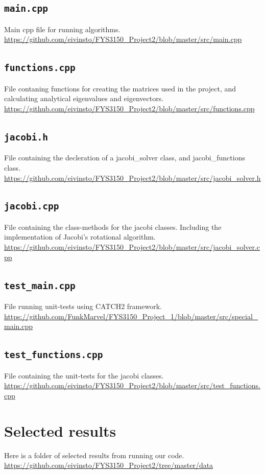 \documentclass[reprint,english,notitlepage]{revtex4-1}  %
\begin{document}
\cprotect\subsection{\verb+main.cpp+} \label{A.2}
Main cpp file for running algorithms.
\url{https://github.com/eivinsto/FYS3150_Project2/blob/master/src/main.cpp}

\cprotect\subsection{\verb+functions.cpp+} \label{A.3}
File contaning functions for creating the matrices used in the project, and calculating analytical eigenvalues and eigenvectors.
\url{https://github.com/eivinsto/FYS3150_Project2/blob/master/src/functions.cpp}

\cprotect\subsection{\verb+jacobi.h+} \label{A.4}
File containing the decleration of a jacobi\_solver class, and jacobi\_functions class.
\url{https://github.com/eivinsto/FYS3150_Project2/blob/master/src/jacobi_solver.h}

\cprotect\subsection{\verb+jacobi.cpp+} \label{A.5}
File containing the class-methods for the jacobi classes. Including the implementation of Jacobi's rotational algorithm.
\url{https://github.com/eivinsto/FYS3150_Project2/blob/master/src/jacobi_solver.cpp}

\cprotect\subsection{\verb+test_main.cpp+} \label{A.6}
File running unit-tests using CATCH2 framework.
\url{https://github.com/FunkMarvel/FYS3150_Project_1/blob/master/src/special_main.cpp}

\cprotect\subsection{\verb+test_functions.cpp+} \label{A.7}
File containing the unit-tests for the jacobi classes.
\url{https://github.com/eivinsto/FYS3150_Project2/blob/master/src/test_functions.cpp}

\section{Selected results} \label{B}
Here is a folder of selected results from running our code.
\url{https://github.com/eivinsto/FYS3150_Project2/tree/master/data}
\end{document}

